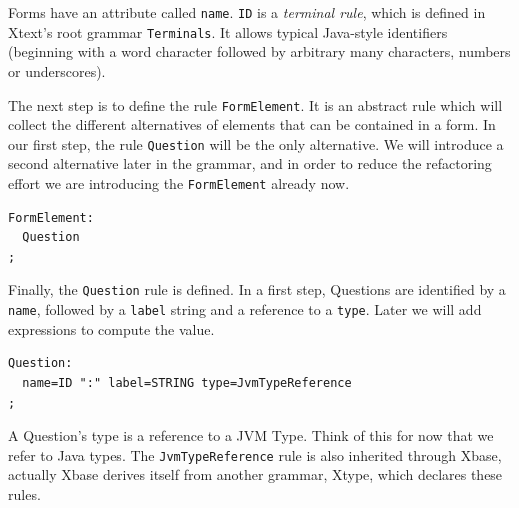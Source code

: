 Forms have an attribute called \texttt{name}. \texttt{ID} is a \emph{terminal rule},
which is defined in Xtext's root grammar \texttt{Terminals}. It allows typical
Java-style identifiers (beginning with a word character followed by arbitrary many characters,
numbers or underscores).

The next step is to define the rule \texttt{FormElement}. It is an abstract rule which
will collect the different alternatives of elements that can be contained in a
form. In our first step, the rule \texttt{Question} will be the only alternative. We will
introduce a second alternative later in the grammar, and in order to reduce the
refactoring effort we are introducing the \texttt{FormElement} already now.

\begin{lstlisting}[language=Xtext]
FormElement:
  Question
;
\end{lstlisting}

Finally, the \texttt{Question} rule is defined. In a first step, Questions are identified
by a \texttt{name}, followed by a \texttt{label} string and a reference to a \texttt{type}. Later we will
add expressions to compute the value.

\begin{lstlisting}[language=Xtext]
Question:
  name=ID ":" label=STRING type=JvmTypeReference
;
\end{lstlisting}

A Question's type is a reference to a JVM Type. Think of this for now that we
refer to Java types. The \texttt{JvmTypeReference} rule is also inherited through Xbase,
actually Xbase derives itself from another grammar, Xtype, which declares these
rules.

